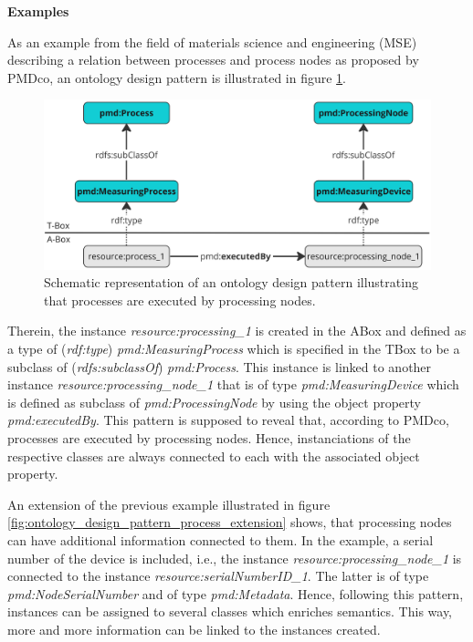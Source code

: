 \textbf{Examples}

As an example from the field of materials science and engineering (MSE) describing a relation between processes and process nodes as proposed by PMDco, an ontology design pattern is illustrated in figure \ref{fig:ontology_design_pattern_process}. 

\begin{figure}[!h]
 \centering
 \includegraphics[width=1\textwidth]{fig/Ontology_Design_Pattern_Processes.jpg}
 \caption{Schematic representation of an ontology design pattern illustrating that processes are executed by processing nodes.}
 \label{fig:ontology_design_pattern_process}
\end{figure}

Therein, the instance \textit{resource:processing\_1} is created in the ABox and defined as a type of (\textit{rdf:type}) \textit{pmd:MeasuringProcess} which is specified in the TBox to be a subclass of (\textit{rdfs:subclassOf}) \textit{pmd:Process}. This instance is linked to another instance \textit{resource:processing\_node\_1} that is of type \textit{pmd:MeasuringDevice} which is defined as subclass of \textit{pmd:ProcessingNode} by using the object property \textit{pmd:executedBy}. This pattern is supposed to reveal that, according to PMDco, processes are executed by processing nodes. Hence, instanciations of the respective classes are always connected to each with the associated object property.

An extension of the previous example illustrated in figure \ref{fig:ontology_design_pattern_process_extension} shows, that processing nodes can have additional information connected to them. In the example, a serial number of the device is included, i.e., the instance \textit{resource:processing\_node\_1} is connected to the instance \textit{resource:serialNumberID\_1}. The latter is of type \textit{pmd:NodeSerialNumber} and of type \textit{pmd:Metadata}. Hence, following this pattern, instances can be assigned to several classes which enriches semantics. This way, more and more information can be linked to the instances created.

